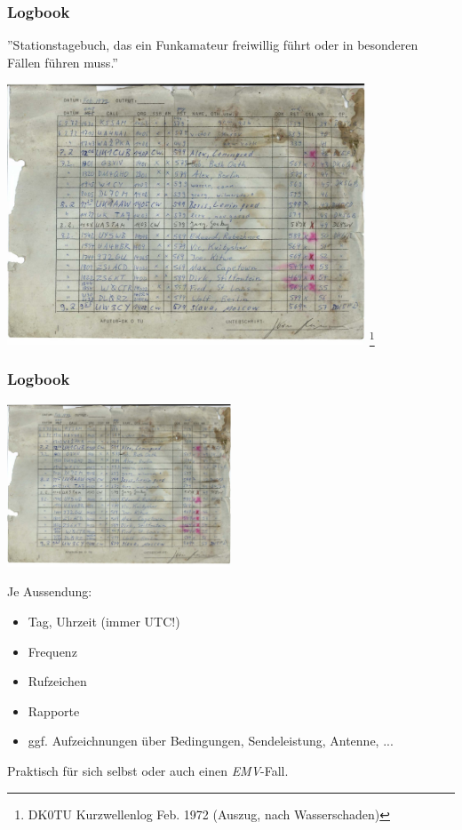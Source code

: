 \begin{frame}
    \frametitle{Logbook}

    ''Stationstagebuch, das ein Funkamateur freiwillig führt oder in besonderen
    Fällen führen muss.''

    \begin{center}
        \includegraphics[width=0.8\textwidth]{bv13/DK0TU_LOG_KW_1972-02_Auszug.jpg}
        \tiny \footnote{DK0TU Kurzwellenlog Feb. 1972 (Auszug, nach Wasserschaden)}
    \end{center}

\end{frame}

\begin{frame}
    \frametitle{Logbook}

    \begin{center}
        \includegraphics[width=0.5\textwidth]{bv13/DK0TU_LOG_KW_1972-02_Auszug.jpg}
    \end{center}

    Je Aussendung:
    
    \begin{itemize}
        \item Tag, Uhrzeit (immer UTC!)
        \item Frequenz
        \item Rufzeichen
        \item Rapporte
        \item ggf. Aufzeichnungen über Bedingungen, Sendeleistung, Antenne, ...
    \end{itemize}

    Praktisch für sich selbst oder auch einen \emph{EMV}-Fall.

\end{frame}

